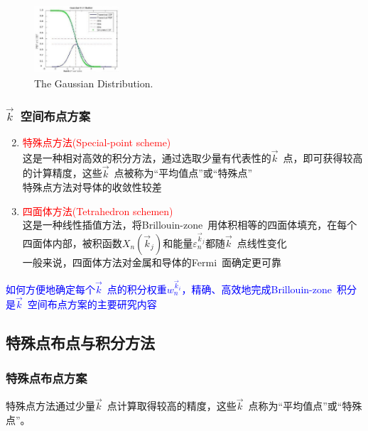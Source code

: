 {{\begin{enumerate}
\begin{itemize}
\begin{figure}[h!]
\begin{minipage}[t]{0.55\linewidth}
					\includegraphics[height=1.0in,width=1.25in,viewport=0 0 530 500,clip]{Figures/Gaussian-distribution.jpg}
					\caption{\tiny \textrm{The Gaussian Distribution.}}%
					\label{Gaussian-distribution}
					\end{minipage}
				\end{figure} 
		\end{itemize}
\end{enumerate}
}

\frame
{
\frametitle{$\vec k$~空间布点方案}
\begin{enumerate}
	\setcounter{enumi}{1}
\setlength{\itemsep}{10pt}
	\item \textcolor{red}{特殊点方法\textrm{(Special-point scheme)}}\\这是一种相对高效的积分方法，通过选取少量有代表性的$\vec k$~点，即可获得较高的计算精度，这些$\vec k$~点被称为“平均值点”或“特殊点”\\特殊点方法对导体的收敛性较差
	\item \textcolor{red}{四面体方法\textrm{(Tetrahedron schemen)}}\\这是一种线性插值方法，将\textrm{Brillouin-zone~}用体积相等的四面体填充，在每个四面体内部，被积函数$X_n(\vec k_j)$和能量$\varepsilon_n^{\vec k_j}$都随$\vec k$~点线性变化\\一般来说，四面体方法对金属和导体的\textrm{Fermi~}面确定更可靠
\end{enumerate}
\textcolor{blue}{如何方便地确定每个$\vec k$~点的积分权重$w_n^{\vec k_i}$，精确、高效地完成\textrm{Brillouin-zone~}积分是$\vec k$~空间布点方案的主要研究内容}
}

\subsection{特殊点布点与积分方法}
\frame
{
	\frametitle{特殊点布点方案}
	特殊点方法通过少量$\vec k$~点计算取得较高的精度，这些$\vec k$~点称为“平均值点”或“特殊点”。
	
}}
